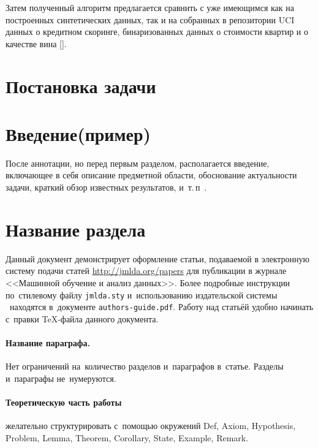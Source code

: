 \documentclass[12pt,twoside]{article}
\begin{document}
Затем полученный алгоритм предлагается сравнить с уже имеющимся как на построенных синтетических данных, так и на собранных в репозитории UCI данных о кредитном скоринге, бинаризованных данных о стоимости квартир и о качестве вина [].

\section{Постановка задачи}



\section{Введение(пример)}
После аннотации, но перед первым разделом,
располагается введение, включающее в себя
описание предметной области,
обоснование актуальности задачи,
краткий обзор известных результатов,
и~т.\,п~\cite{author09anyscience,myHandbook,author09first-word-of-the-title,voron06latex,author-and-co2007,Lvovsky03}.

\section{Название раздела}
Данный документ демонстрирует оформление статьи,
подаваемой в электронную систему подачи статей \url{http://jmlda.org/papers} для публикации в журнале <<Машинной обучение и анализ данных>>.
Более подробные инструкции по~стилевому файлу \texttt{jmlda.sty}
и~использованию издательской системы \LaTeXe\
находятся в~документе \texttt{authors-guide.pdf}.
Работу над статьёй удобно начинать с~правки \TeX-файла данного документа.

\paragraph{Название параграфа.}
Нет ограничений на~количество разделов и~параграфов в~статье.
Разделы и~параграфы не~нумеруются.

\paragraph{Теоретическую часть работы} желательно структурировать
с~помощью окружений
Def, Axiom, Hypothesis, Problem, Lemma, Theorem, Corollary, State, Example, Remark.
\end{document}
